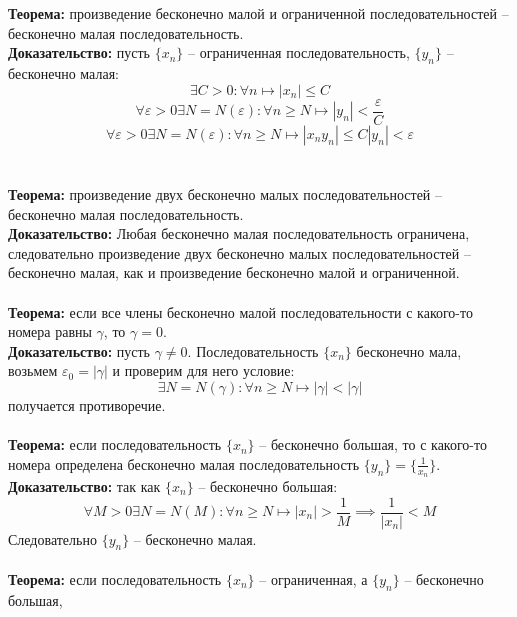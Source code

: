 \documentclass{article}
\begin{document}
        \\
        \\
        \textbf{Теорема:} произведение бесконечно малой и ограниченной последовательностей -- бесконечно малая последовательность.
        \\
        \textbf{Доказательство:}
        пусть $\{x_n\}$ -- ограниченная последовательность, $\{y_n\}$ -- бесконечно малая:
        \[ \exists C > 0: \forall n \longmapsto |x_n| \le C \]
        \[ \forall \varepsilon > 0 \exists N = N(\varepsilon): \forall n \ge N \longmapsto |y_n| < \frac{\varepsilon}{C} \]
        \[ \forall \varepsilon > 0 \exists N = N(\varepsilon): \forall n \ge N \longmapsto |x_ny_n| \le C|y_n| < \varepsilon \]
        \\
        \\
        \textbf{Теорема:} произведение двух бесконечно малых последовательностей -- бесконечно малая последовательность.
        \\
        \textbf{Доказательство:}
        Любая бесконечно малая последовательность ограничена, следовательно произведение двух бесконечно малых последовательностей -- бесконечно
        малая, как и произведение бесконечно малой и ограниченной.
        \\
        \\
        \textbf{Теорема:} если все члены бесконечно малой последовательности с какого-то номера равны $\gamma$, то $\gamma = 0$.
        \\
        \textbf{Доказательство:}
        пусть $\gamma \neq 0$. Последовательность $\{x_n\}$ бесконечно мала, возьмем $\varepsilon_0 = |\gamma|$ и проверим для него условие:
        \[ \exists N = N(\gamma): \forall n \ge N \longmapsto |\gamma| < |\gamma| \]
        получается противоречие.
        \\
        \\
        \textbf{Теорема:} если последовательность $\{x_n\}$ -- бесконечно большая, то с какого-то номера определена бесконечно малая последовательность $\{y_n\} = \{\frac{1}{x_n}\}$.
        \\
        \textbf{Доказательство:}
        так как $\{x_n\}$ -- бесконечно большая:
        \[ \forall M > 0 \exists N = N(M): \forall n \ge N \longmapsto |x_n| > \frac{1}{M} \implies \frac{1}{|x_n|} < {M}\]
        Следовательно $\{y_n\}$ -- бесконечно малая.
        \\
        \\
        \textbf{Теорема:} если последовательность $\{x_n\}$ -- ограниченная, а $\{y_n\}$ -- бесконечно большая,
\end{document}
